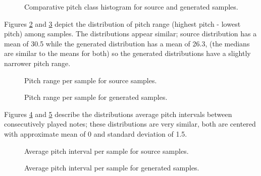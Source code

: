 \documentclass[sigconf,authorversion]{acmart}
\begin{document}
\begin{figure}[htbp]
    \begin{center}
        \scalebox{0.6}{}
    \end{center}
    \caption{Comparative pitch class histogram for source and generated samples.}
    \label{pch}
\end{figure}

Figures \ref{source_ranges} and \ref{generated_ranges} depict the
distribution of pitch range (highest pitch - lowest pitch) among
samples. The distributions appear similar; source distribution has a
mean of 30.5 while the generated distribution has a mean of 26.3, (the
medians are similar to the means for both) so the generated
distributions have a slightly narrower pitch range.

\begin{figure}[htbp]
    \begin{center}
        \scalebox{0.6}{}
    \end{center}
    \caption{Pitch range per sample for source samples.}
    \label{source_ranges}
\end{figure}

\begin{figure}[htbp]
    \begin{center}
        \scalebox{0.6}{}
    \end{center}
    \caption{Pitch range per sample for generated samples.}
    \label{generated_ranges}
\end{figure}

Figures \ref{source_interval} and \ref{generated_interval} describe
the distributions average pitch intervals between consecutively played
notes; these distributions are very similar, both are centered with
approximate mean of 0 and standard deviation of 1.5.

\begin{figure}[htbp]
    \begin{center}
        \scalebox{0.6}{}
    \end{center}
    \caption{Average pitch interval per sample for source samples.}
    \label{source_interval}
\end{figure}

\begin{figure}[htbp]
    \begin{center}
        \scalebox{0.6}{}
    \end{center}
    \caption{Average pitch interval per sample for generated samples.}
    \label{generated_interval}
\end{figure}
\end{document}
